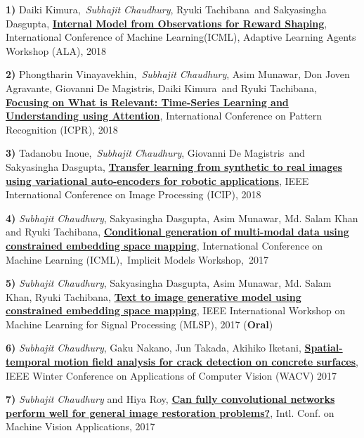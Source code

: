 \documentclass[margin,line]{res}
\begin{document}
\begin{resume}

\textbf{1)} Daiki Kimura, \textit{Subhajit Chaudhury},  Ryuki Tachibana and Sakyasingha Dasgupta, \textbf{\href{https://arxiv.org/abs/1806.01267}{Internal Model from Observations for Reward Shaping}}, International Conference of Machine Learning(ICML), Adaptive Learning Agents Workshop (ALA), 2018

\textbf{2)} Phongtharin Vinayavekhin, \textit{Subhajit Chaudhury},  Asim Munawar, Don Joven Agravante, Giovanni De Magistris, Daiki Kimura and Ryuki Tachibana, \textbf{\href{https://arxiv.org/abs/1806.08523}{Focusing on What is Relevant: Time-Series Learning and Understanding using Attention}}, International Conference on Pattern Recognition (ICPR), 2018

\textbf{3)} Tadanobu Inoue, \textit{Subhajit Chaudhury}, Giovanni De Magistris and Sakyasingha Dasgupta, \textbf{\href{https://arxiv.org/abs/1709.06762}{Transfer learning from synthetic to real images using variational auto-encoders for robotic applications}}, IEEE International Conference on Image Processing (ICIP), 2018

\textbf{4)} \textit{Subhajit Chaudhury}, Sakyasingha Dasgupta, Asim Munawar, Md. Salam Khan and Ryuki Tachibana, \textbf{\href{https://arxiv.org/abs/1707.00860}{Conditional generation of multi-modal data using constrained embedding space mapping}},	International Conference on Machine Learning (ICML), Implicit Models Workshop, 2017 

\textbf{5)} \textit{Subhajit Chaudhury}, Sakyasingha Dasgupta, Asim Munawar, Md. Salam Khan, Ryuki Tachibana, \textbf{\href{https://www.researchgate.net/publication/319256866_Text_to_Image_Generative_Model_Using_Constrained_Embedding_Space_Mapping}{Text to image generative model using constrained embedding space mapping}}, IEEE International Workshop on Machine Learning for Signal Processing (MLSP), 2017 (\textbf{Oral})

\textbf{6)} \textit{Subhajit Chaudhury}, Gaku Nakano, Jun Takada, Akihiko Iketani, \textbf{\href{http://ieeexplore.ieee.org/document/7926627/}{Spatial-temporal motion field analysis for crack detection on concrete surfaces}}, IEEE Winter Conference on Applications of Computer Vision (WACV) 2017

\textbf{7)} \textit{Subhajit Chaudhury} and Hiya Roy, \textbf{\href{http://ieeexplore.ieee.org/document/7986849/}{Can fully convolutional networks perform well for general image restoration problems?}}, Intl. Conf. on Machine Vision Applications, 2017


\end{resume}
\end{document}
